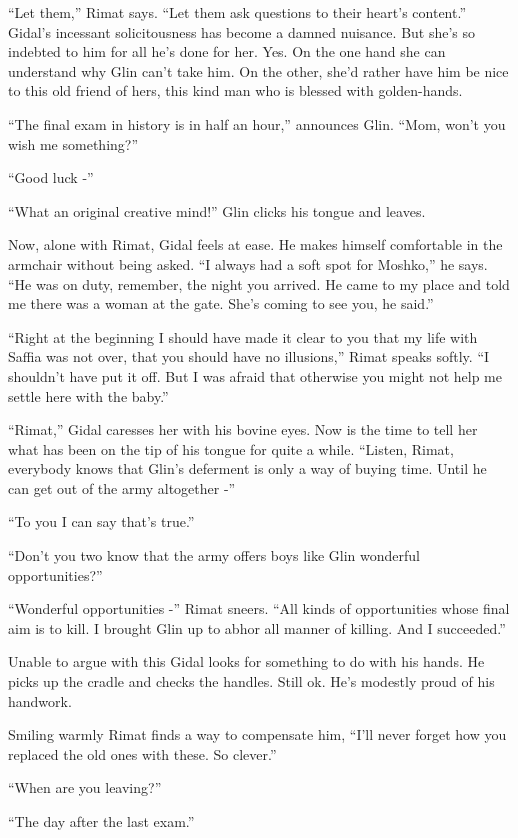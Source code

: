 \documentclass[twoside,11pt]{book}
\begin{document}
``Let them,'' Rimat says. ``Let them ask questions to their heart's
content.'' Gidal's incessant solicitousness has become a damned nuisance. But she's so indebted to him for
all he's done for her. Yes. On the one hand she can understand why Glin can't take him. On the other, she'd rather have
him be nice to this old friend of hers, this kind man who is blessed with golden-hands.

``The final exam in history is in half an hour,'' announces Glin. ``Mom, won't
you wish me something?''

``Good luck -''

``What an original creative mind!'' Glin clicks his tongue and leaves.

Now, alone with Rimat, Gidal feels at ease. He makes himself comfortable in the armchair without being asked.
``I always had a soft spot for Moshko,'' he says. ``He was on duty, remember,
the night you arrived. He came to my place and told me there was a woman at the gate. She's coming to see you, he
said.''

``Right at the beginning I should have made it clear to you that my life with Saffia was not over, that you
should have no illusions,'' Rimat speaks softly. ``I shouldn't have put it off. But I was afraid that otherwise you
might not help me settle here with the baby.''

``Rimat,'' Gidal caresses her with his bovine eyes. Now is the time to tell her what has been
on the tip of his tongue for quite a while. ``Listen, Rimat, everybody knows that Glin's
deferment is only a way of buying time. Until he can get out of the army altogether -''

``To you I can say that's true.''

``Don't you two know that the army offers boys like Glin wonderful opportunities?''

``Wonderful opportunities -'' Rimat sneers. ``All kinds of opportunities whose
final aim is to kill. I brought Glin up to abhor all manner of killing. And I succeeded.''

Unable to argue with this Gidal looks for something to do with his hands. He picks up the cradle and checks the handles.
Still ok. He's modestly proud of his handwork.

Smiling warmly Rimat finds a way to compensate him, ``I'll never forget how you replaced the old ones
with these. So clever.''

``When are you leaving?''

``The day after the last exam.''
\end{document}
